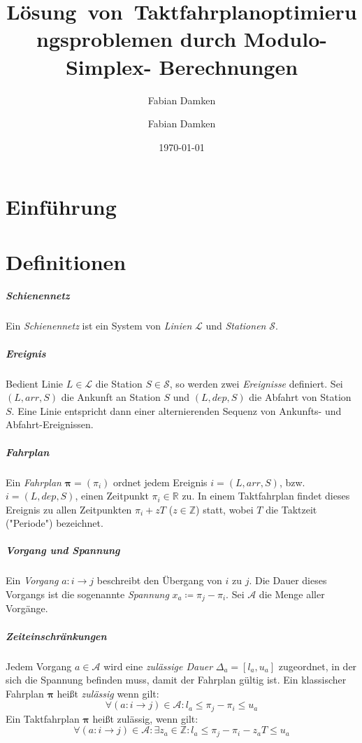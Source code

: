 \documentclass[accentcolor = tud11b, a4paper, 11pt, tudmathserif]{tudexercise}
\title{Lösung~von~Takt\-fahr\-plan\-op\-ti\-mie\-rungs\-pro\-ble\-men durch Mo\-du\-lo-Sim\-plex- Be\-rech\-nung\-en}
\subtitle{Fabian Damken}
\author{Fabian Damken}
\date{\today}
\newcommand{\arr}{\mathit{arr}}
\newcommand{\dep}{\mathit{dep}}
\newcommand{\R}{\ensuremath{\mathbb{R}}}
\newcommand{\Z}{\ensuremath{\mathbb{Z}}}
\renewcommand{\vec}[1]{\boldsymbol{#1}}
\newcommand{\bzw}{bzw.~}
\begin{document}
	

	\maketitle
	
	\section*{Einführung}

	\section*{Definitionen}
		\subparagraph{Schienennetz}
		Ein \emph{Schienennetz} ist ein System von \emph{Linien} \(\mathcal{L}\) und \emph{Stationen} \(\mathcal{S}\).
	
		\subparagraph{Ereignis}
		Bedient Linie \( L \in \mathcal{L} \) die Station \( S \in \mathcal{S} \), so werden zwei \emph{Ereignisse} definiert. Sei \( (L, \arr, S) \) die Ankunft an Station \(S\) und \( (L, \dep, S) \) die Abfahrt von Station \(S\). Eine Linie entspricht dann einer alternierenden Sequenz von Ankunfts- und Abfahrt-Ereignissen.
	
		\subparagraph{Fahrplan}
		Ein \emph{Fahrplan} \( \vec{\pi} = (\pi_i) \) ordnet jedem Ereignis \( i = (L, \arr, S) \), \bzw \( i = (L, \dep, S) \), einen Zeitpunkt \( \pi_i \in \R \) zu. In einem Taktfahrplan findet dieses Ereignis zu allen Zeitpunkten \( \pi_i + z T \) (\( z \in \Z \)) statt, wobei \( T \) die Taktzeit ("Periode") bezeichnet.
		
		\subparagraph{Vorgang und Spannung}
		Ein \emph{Vorgang} \( a : i \to j \) beschreibt den Übergang von \(i\) zu \(j\). Die Dauer dieses Vorgangs ist die sogenannte \emph{Spannung} \( x_a \coloneqq \pi_j - \pi_i \). Sei \(\mathcal{A}\) die Menge aller Vorgänge.
		
		\subparagraph{Zeiteinschränkungen}
		Jedem Vorgang \( a \in \mathcal{A} \) wird eine \emph{zulässige Dauer} \( \Delta_a = [l_a, u_a] \) zugeordnet, in der sich die Spannung befinden muss, damit der Fahrplan gültig ist. Ein klassischer Fahrplan \(\vec{\pi}\) heißt \emph{zulässig} wenn gilt:
		\begin{equation*}
			\forall (a : i \to j) \in \mathcal{A} : l_a \leq \pi_j - \pi_i \leq u_a
		\end{equation*}
		Ein Taktfahrplan \( \vec{\pi} \) heißt zulässig, wenn gilt:
		\begin{equation*}
			\forall (a : i \to j) \in \mathcal{A} : \exists z_a \in \Z : l_a \leq \pi_j - \pi_i - z_a T \leq u_a
		\end{equation*}
		
\end{document}
